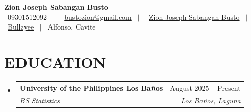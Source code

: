 \documentclass[letterpaper,11pt]{article}
\makeatletter
\newcommand{\resumeSubheading}[4]{
\item
\begin{tabular*}{\textwidth}{l@{\extracolsep{\fill}}r}
\textbf{#1} & {\small #2} \\
\textit{#3} & \textit{\small #4} \\
\end{tabular*}
}
\makeatother
\begin{document}
\begin{center}
    \textbf{\Huge Zion Joseph Sabangan Busto} \\ \vspace{4pt}
    \small
    \faPhone* \ 09301512092 \ $|$ \
    \faEnvelope \ \href{mailto:bustozion@gmail.com}{bustozion@gmail.com} \ $|$ \
    \faLinkedin \ \href{https://www.linkedin.com/in/zion-joseph-sabangan-busto-8a255a318/}{Zion Joseph Sabangan Busto} \ $|$ \
    \faGithub \href{https://github.com/Bullzyee}{Bullzyee} \ $|$
    \faMapMarker* \ Alfonso, Cavite
\end{center}

\section{EDUCATION}
\begin{itemize}[leftmargin=0in, label={}]
\resumeSubheading
{University of the Philippines Los Baños}{August 2025 -- Present}
{BS Statistics}{Los Baños, Laguna}
\end{itemize}
\end{document}
